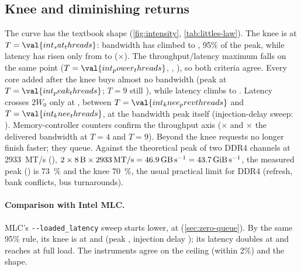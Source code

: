 \subsection{Knee and diminishing returns}
The curve has the textbook shape (\cref{fig:intensity}, \cref{tab:littles-law}). The knee is at
$T=\val{int_sat_threads}$: bandwidth has climbed to
, 95\% of the  peak,
while latency has risen only from  to 
($\times$). The throughput/latency maximum falls on the same point
($T=\val{int_power_threads}$, , ),
so both criteria agree. Every core added after the knee buys almost no bandwidth (peak at
$T=\val{int_peak_threads}$; $T=9$ still ), while latency climbs
to . Latency crosses $2W_0$ only at
, between $T=\val{int_knee_prevthreads}$ and
$T=\val{int_knee_threads}$, at the bandwidth peak itself (injection-delay sweep:
). Memory-controller counters confirm the throughput axis
($\times$ and $\times$ the delivered bandwidth at $T=4$ and $T=9$).
Beyond the knee requests no longer finish faster; they queue. Against the theoretical peak of two DDR4 channels at \qty{2933}{MT/s} (),
$2\times\qty{8}{\byte}\times\qty{2933}{MT/s}=\qty{46.9}{\giga\byte\per\second}=\qty{43.7}{\gibi\byte\per\second}$,
the measured peak () is \qty{73}{\percent} and the knee
\qty{70}{\percent}, the usual practical limit for DDR4 (refresh, bank conflicts, bus turnarounds).

\paragraph{Comparison with Intel MLC.} MLC's \texttt{-{}-loaded\_latency} sweep starts lower, at
 (\cref{sec:zero-queue}). By the same 95\% rule, its knee is at  and
 (peak , injection delay
); its latency doubles at  and reaches
 at full load. The instruments agree on the ceiling (within 2\%) and the
shape.


